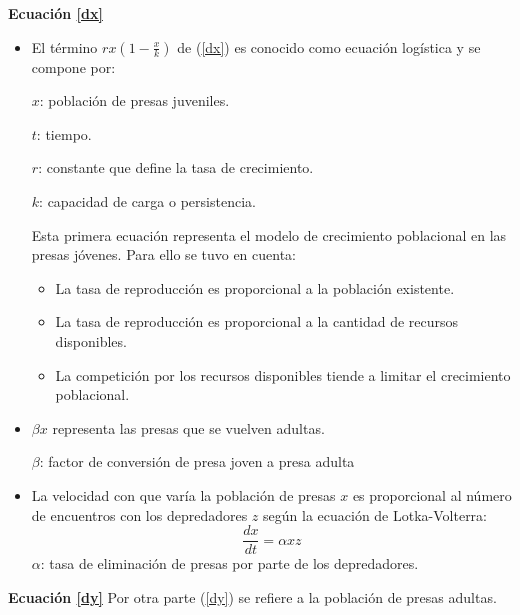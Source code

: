\documentclass{wscpaperproc}
\theoremstyle{wsc}
\begin{document}
{\bf Ecuación \ref*{dx}}
\begin{itemize}
	\item El término $rx(1-\frac{x}{k})$ de (\ref*{dx}) es conocido como ecuación
	      logística y se compone por:
	      \vspace*{0.3cm}

	      $x$: población de presas juveniles.

	      $t$: tiempo.

	      $r$: constante que define la tasa de crecimiento.

	      $k$: capacidad de carga o persistencia.

	      \vspace*{0.5cm}

	      Esta primera ecuación representa el modelo de crecimiento poblacional en las
	      presas jóvenes. Para ello se tuvo en cuenta:
	      \begin{itemize}
		      \item La tasa de reproducción es proporcional a la población existente.
		      \item La tasa de reproducción es proporcional a la cantidad de recursos disponibles.
		      \item La competición por los recursos disponibles tiende a limitar el crecimiento poblacional.
	      \end{itemize}

	\item $\beta x$ representa las presas que se vuelven adultas.

	      \vspace*{0.3cm}

	      $\beta$: factor de conversión de presa joven a presa adulta

	      \vspace*{0.3cm}

	\item La velocidad con que varía la población de presas $x$ es proporcional al número de encuentros con los depredadores $z$ según la ecuación de Lotka-Volterra:
	      $$\frac{dx}{dt}=\alpha xz$$
	      $\alpha$: tasa de eliminación de presas por parte de los depredadores.
\end{itemize}

\vspace*{1cm}
{\bf Ecuación \ref*{dy}}
Por otra parte (\ref*{dy}) se refiere a la población de presas adultas.
\end{document}
